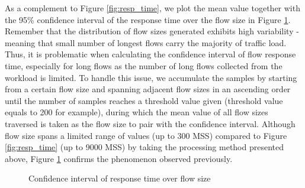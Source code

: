 \documentclass[preprint,12pt]{elsarticle}
\begin{document}
As a complement to Figure \ref{fig:resp_time}, we plot the mean value together with the 95\% confidence interval of the response time over the flow size in Figure \ref{fig:resp_time_ci}. Remember that the distribution of flow sizes generated exhibits high variability - meaning that small number of longest flows carry the majority of traffic load. Thus, it is problematic when calculating the confidence interval of flow response time, especially for long flows as the number of long flows collected from the workload is limited. To handle this issue, we accumulate the samples by starting from a certain flow size and spanning adjacent flow sizes in an ascending order until the number of samples reaches a threshold value given (threshold value equals to 200 for example), during which the mean value of all flow sizes traversed is taken as the flow size to pair with the confidence interval. Although flow size spans a limited range of values (up to 300 MSS) compared to Figure \ref{fig:resp_time} (up to 9000 MSS) by taking the processing method presented above, Figure \ref{fig:resp_time_ci} confirms the phenomenon observed previously.%

\begin{figure}[ht]
  \centering
  \caption{Confidence interval of response time over flow size}
  \label{fig:resp_time_ci}
\end{figure}
\end{document}
